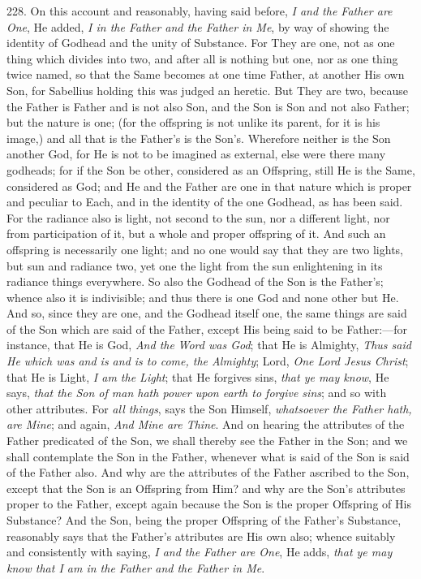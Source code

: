 228. On this
account and reasonably, having said before, \emph{I and the Father are
One}, He added, \emph{I in the Father and the Father in Me}, by way
of showing the identity of Godhead and the unity of Substance. For
They are one, not as one thing which divides into two, and after all
is nothing but one, nor as one thing twice named, so that the Same
becomes at one time Father, at another His own Son, for Sabellius
holding this was judged an heretic. But They are two, because the
Father is Father and is not also Son, and the Son is Son and not also
Father; but the nature is one; (for the offspring is not unlike its
parent, for it is his image,) and all that is the Father's is the Son's.
Wherefore neither is the Son another God, for He is not to be imagined
as external, else were there many godheads; for if the Son be other,
considered as an Offspring, still He is the Same, considered as God;
and He and the Father are one in that nature which is proper and
peculiar to Each, and in the identity of the one Godhead, as has been
said. For the radiance also is light, not second to the sun, nor a
different light, nor from participation of it, but a whole and proper
offspring of it. And such an offspring is necessarily one light; and
no one would say that they are two lights, but sun and radiance two,
yet one the light from the sun enlightening in its radiance things
everywhere. So also the Godhead of the Son is the Father's; whence
also it is indivisible; and thus there is one God and none other but
He. And so, since they are one, and the Godhead itself one, the same
things are said of the Son which are said of the Father, except His
being said to be Father:—for instance, that He is God, \emph{And the}
\emph{Word was God}; that He is Almighty, \emph{Thus said He which
was and is and is to come, the Almighty}; Lord, \emph{One Lord Jesus
Christ}; that He is Light, \emph{I am the Light}; that He forgives
sins, \emph{that ye may know}, He says, \emph{that the Son of man hath
power upon earth to forgive sins}; and so with other attributes.
For \emph{all things}, says the Son Himself, \emph{whatsoever the Father
hath, are Mine}; and again, \emph{And Mine are Thine}. And on
hearing the attributes of the Father predicated of the Son, we shall
thereby see the Father in the Son; and we shall contemplate the Son in
the Father, whenever what is said of the Son is said of the Father
also. And why are the attributes of the Father ascribed to the Son,
except that the Son is an Offspring from Him? and why are the Son's
attributes proper to the Father, except again because the Son is the
proper Offspring of His Substance? And the Son, being the proper
Offspring of the Father's Substance, reasonably says that the Father's
attributes are His own also; whence suitably and consistently with
saying, \emph{I and the Father are One}, He adds, \emph{that ye may know
that I am in the Father and the Father in Me}.

